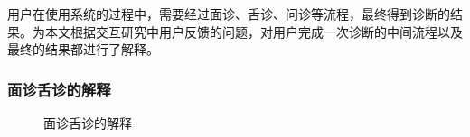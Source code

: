 用户在使用系统的过程中，需要经过面诊、舌诊、问诊等流程，最终得到诊断的结果。为本文根据交互研究中用户反馈的问题，对用户完成一次诊断的中间流程以及最终的结果都进行了解释。

\subsubsection{面诊舌诊的解释}

\begin{figure}[htbp]   
    \centering
    \caption{面诊舌诊的解释}
    \label{fig:face_diags}
\end{figure}

